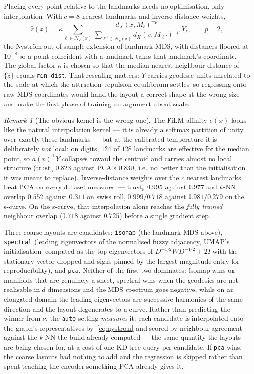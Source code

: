 \documentclass[12pt]{iopart}
\theoremstyle{definition}
\theoremstyle{plain}
\theoremstyle{remark}
\newtheorem{remark}{Remark}
\newcommand{\Nb}{\mathcal{N}}
\newcommand{\code}[1]{\texttt{#1}}
\begin{document}
Placing every point relative to the landmarks needs no optimisation, only
interpolation. With $c=8$ nearest landmarks and inverse-distance weights,
\begin{equation}
\label{eq:nystrom}
\hat z(x)
=
\kappa\sum_{\ell\in\Nb_c(x)}
\frac{d_X(x,M_\ell)^{-p}}{\sum_{\ell'\in\Nb_c(x)}d_X(x,M_{\ell'})^{-p}}\,
Y_\ell,
\qquad p=2,
\end{equation}
the Nystr\"om out-of-sample extension of landmark MDS, with distances floored
at $10^{-8}$ so a point coincident with a landmark takes that landmark's
coordinate. The global factor $\kappa$ is chosen so that the median
nearest-neighbour distance of $\{\hat z\}$ equals \code{min\_dist}. That
rescaling matters: $Y$ carries geodesic units unrelated to the scale at which
the attraction--repulsion equilibrium settles, so regressing onto raw MDS
coordinates would hand the layout a correct shape at the wrong size and make
the first phase of training an argument about scale.

\begin{remark}[The obvious kernel is the wrong one]
\label{rem:nystromkernel}
The FiLM affinity $a(x)$ looks like the natural interpolation kernel --- it is
already a softmax partition of unity over exactly these landmarks --- but at
the calibrated temperature it is deliberately \emph{not} local: on digits, $124$
of $128$ landmarks are effective for the median point, so $a(x)^\top Y$
collapses toward the centroid and carries almost no local structure
($\mathrm{trust}_5$ $0.823$ against PCA's $0.830$, i.e.\ no better than the
initialisation it was meant to replace). Inverse-distance weights over the $c$
nearest landmarks beat PCA on every dataset measured --- $\mathrm{trust}_5$
$0.995$ against $0.977$ and $k$-NN overlap $0.552$ against $0.311$ on swiss
roll, $0.999/0.718$ against $0.981/0.279$ on the s-curve. On the s-curve, that
interpolation alone reaches the \emph{fully trained} neighbour overlap
($0.718$ against $0.725$) before a single gradient step.
\end{remark}

Three coarse layouts are candidates: \code{isomap} (the landmark MDS above),
\code{spectral} (leading eigenvectors of the normalised fuzzy adjacency,
UMAP's initialisation, computed as the top eigenvectors of
$D^{-1/2}WD^{-1/2}+2I$ with the stationary vector dropped and signs pinned by
the largest-magnitude entry for reproducibility), and \code{pca}. Neither of
the first two dominates: Isomap wins on manifolds that are genuinely a sheet,
spectral wins when the geodesics are not realisable in $d$ dimensions and the
MDS spectrum goes negative, while on an elongated domain the leading
eigenvectors are successive harmonics of the same direction and the layout
degenerates to a curve. Rather than predicting the winner from $\nu$, the
\code{auto} setting \emph{measures} it: each candidate is interpolated onto the
graph's representatives by~\eqref{eq:nystrom} and scored by neighbour agreement
against the $k$-NN the build already computed --- the same quantity the layouts
are being chosen for, at a cost of one KD-tree query per candidate. If
\code{pca} wins, the coarse layouts had nothing to add and the regression is
skipped rather than spent teaching the encoder something PCA already gives it.
\end{document}
